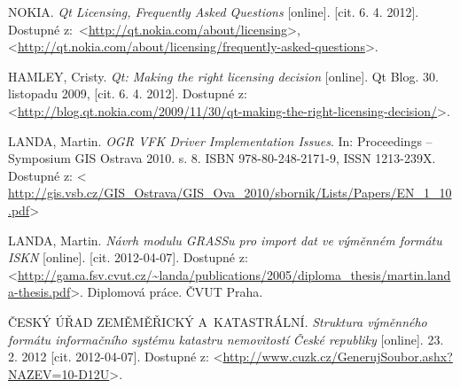 \documentclass[a4paper,12pt]{article}
\begin{document}
\newpage
\renewcommand{\refname}{Literatura}
{}
\begin{thebibliography}{9}

NOKIA. \textit{Qt Licensing, Frequently Asked Questions} [online]. [cit. 6. 4. 2012].
Dostupné z:~\textless\url{http://qt.nokia.com/about/licensing}\textgreater, \textless\url{http://qt.nokia.com/about/licensing/frequently-asked-questions}\textgreater.

HAMLEY, Cristy. \textit{Qt: Making the right licensing decision} [online]. Qt Blog. 30. listopadu 2009, [cit. 6. 4. 2012]. Dostupné z: \textless\url{http://blog.qt.nokia.com/2009/11/30/qt-making-the-right-licensing-decision/}\textgreater.

LANDA, Martin. \textit{OGR VFK Driver Implementation Issues}. In: Proceedings -- Symposium GIS Ostrava 2010. s. 8. ISBN 978-80-248-2171-9, ISSN 1213-239X.
Dostupné z: \textless
\url{http://gis.vsb.cz/GIS_Ostrava/GIS_Ova_2010/sbornik/Lists/Papers/EN_1_10.pdf}\textgreater

LANDA, Martin. \emph{Návrh modulu GRASSu pro import dat ve výměnném formátu ISKN} [online]. [cit. 2012-04-07]. Dostupné z: \textless\url{http://gama.fsv.cvut.cz/~landa/publications/2005/diploma_thesis/martin.landa-thesis.pdf}\textgreater. Diplomová práce. ČVUT Praha.

ČESKÝ ÚŘAD ZEMĚMĚŘICKÝ A~KATASTRÁLNÍ. \emph{Struktura výměnného formátu informačního systému katastru nemovitostí České republiky} [online]. 23. 2. 2012 [cit. 2012-04-07]. Dostupné z: \textless\url{http://www.cuzk.cz/GenerujSoubor.ashx?NAZEV=10-D12U}\textgreater.
    
    \end{thebibliography}
\end{document}
